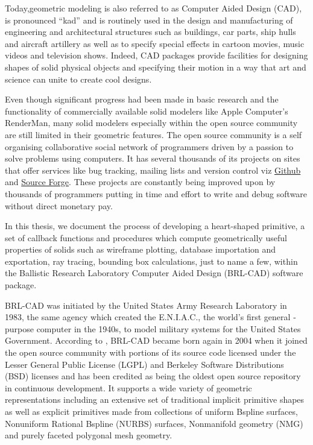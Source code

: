 \hspace{30} Today,geometric modeling is also referred to as Computer ­Aided Design
(CAD), is pronounced “kad” and is routinely used in the design and
manufacturing of engineering and architectural structures such as buildings, car  
parts, ship hulls and aircraft artillery as well as to specify special effects in  
cartoon movies, music videos and television shows. Indeed, CAD packages
provide facilities for designing shapes of solid physical objects and specifying
their motion in a way that art and science can unite to create cool designs.  

\hspace{30} Even though significant progress had been made in basic research and
the functionality of commercially available solid modelers like Apple
Computer's RenderMan, many solid modelers especially within the open
source community are still limited in their geometric features. The open
source community is a self organising collaborative social network of 
programmers driven by a passion to solve problems using computers.
It has several thousands of its projects on sites that offer services 
like bug tracking, mailing lists and version control viz \href{https://github.com/}{Github} 
and \href{http://sourceforge.net}{Source Forge}. These projects are constantly 
being improved upon by thousands of programmers putting in time and effort 
to write and debug software without direct monetary pay.

\hspace{30} In this thesis, we document the process of developing a heart­-shaped
primitive, a set of callback functions and procedures which compute geometrically 
useful properties of solids such as wireframe plotting, database importation and 
exportation, ray tracing, bounding box calculations, just to name a few, within the
 Ballistic Research Laboratory Computer Aided Design (BRL-­CAD) software package.  

\hspace{30} BRL-­CAD was initiated by the United States Army Research Laboratory
in 1983, the same agency which created the E.N.I.A.C., the world's first 
general ­purpose computer in the 1940s, to model military systems for the
United States Government. According to \cite{3}, BRL-­CAD became born again in 
2004 when it joined the open source community with portions of its source
code licensed under the Lesser General Public License (LGPL) and Berkeley
Software Distributions (BSD) licenses and has been credited as being the
oldest open source repository in continuous development. It supports a wide
variety of geometric representations including an extensive set of traditional
implicit primitive shapes as well as explicit primitives made from collections of
uniform B­spline surfaces, Non­uniform Rational B­spline (NURBS) surfaces,  
Non­manifold geometry (NMG) and purely faceted polygonal mesh geometry.  


